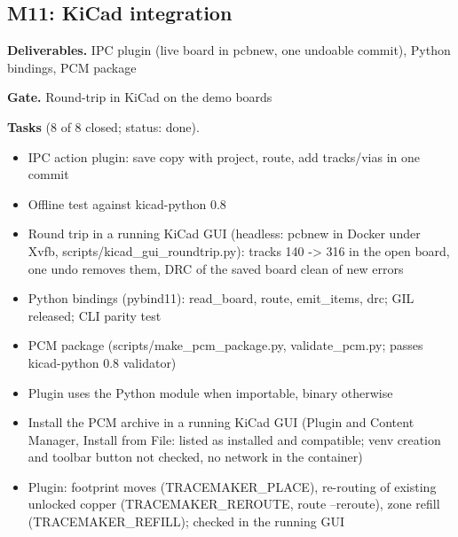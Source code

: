 \subsection*{M11: KiCad integration}
\noindent\textbf{Deliverables.} IPC plugin (live board in pcbnew, one undoable commit), Python bindings, PCM package\par\smallskip
\noindent\textbf{Gate.} Round-trip in KiCad on the demo boards\par\smallskip
\noindent\textbf{Tasks} (8 of 8 closed; status: done).
\begin{itemize}[leftmargin=1.6em,itemsep=1pt]
\item[\textcolor{fraqua}{$\checkmark$}] IPC action plugin: save copy with project, route, add tracks/vias in one commit
\item[\textcolor{fraqua}{$\checkmark$}] Offline test against kicad-python 0.8
\item[\textcolor{fraqua}{$\checkmark$}] Round trip in a running KiCad GUI (headless: pcbnew in Docker under Xvfb, scripts/kicad\_gui\_roundtrip.py): tracks 140 -\textgreater{} 316 in the open board, one undo removes them, DRC of the saved board clean of new errors
\item[\textcolor{fraqua}{$\checkmark$}] Python bindings (pybind11): read\_board, route, emit\_items, drc; GIL released; CLI parity test
\item[\textcolor{fraqua}{$\checkmark$}] PCM package (scripts/make\_pcm\_package.py, validate\_pcm.py; passes kicad-python 0.8 validator)
\item[\textcolor{fraqua}{$\checkmark$}] Plugin uses the Python module when importable, binary otherwise
\item[\textcolor{fraqua}{$\checkmark$}] Install the PCM archive in a running KiCad GUI (Plugin and Content Manager, Install from File: listed as installed and compatible; venv creation and toolbar button not checked, no network in the container)
\item[\textcolor{fraqua}{$\checkmark$}] Plugin: footprint moves (TRACEMAKER\_PLACE), re-routing of existing unlocked copper (TRACEMAKER\_REROUTE, route --reroute), zone refill (TRACEMAKER\_REFILL); checked in the running GUI
\end{itemize}
